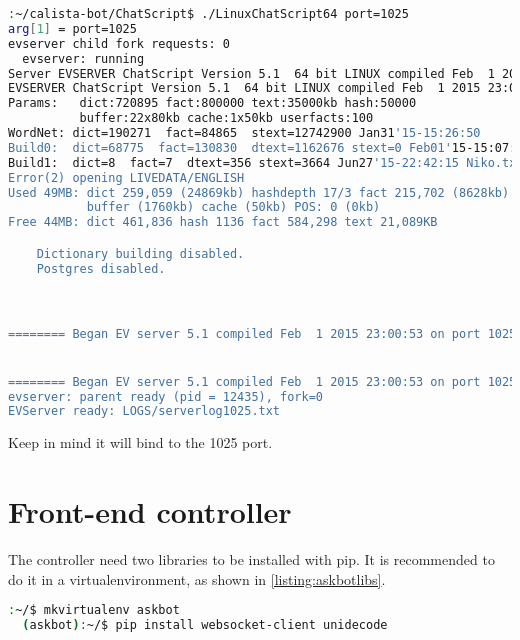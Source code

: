 \begin{center} 
  \begin{lstlisting}[language=bash, captionpos=b, caption=ChatScript Server running, label=listing:csserver]
  :~/calista-bot/ChatScript$ ./LinuxChatScript64 port=1025
arg[1] = port=1025
evserver child fork requests: 0
  evserver: running
Server EVSERVER ChatScript Version 5.1  64 bit LINUX compiled Feb  1 2015 23:00:53
EVSERVER ChatScript Version 5.1  64 bit LINUX compiled Feb  1 2015 23:00:53
Params:   dict:720895 fact:800000 text:35000kb hash:50000 
          buffer:22x80kb cache:1x50kb userfacts:100
WordNet: dict=190271  fact=84865  stext=12742900 Jan31'15-15:26:50
Build0:  dict=68775  fact=130830  dtext=1162676 stext=0 Feb01'15-15:07:58 0.txt
Build1:  dict=8  fact=7  dtext=356 stext=3664 Jun27'15-22:42:15 Niko.txt
Error(2) opening LIVEDATA/ENGLISH
Used 49MB: dict 259,059 (24869kb) hashdepth 17/3 fact 215,702 (8628kb) text 13910kb
           buffer (1760kb) cache (50kb) POS: 0 (0kb)
Free 44MB: dict 461,836 hash 1136 fact 584,298 text 21,089KB 

    Dictionary building disabled.
    Postgres disabled.



======== Began EV server 5.1 compiled Feb  1 2015 23:00:53 on port 1025 at Tue Jun 30 23:41:37 2015 serverlog:1 userlog: 0


======== Began EV server 5.1 compiled Feb  1 2015 23:00:53 on port 1025 at Tue Jun 30 23:41:37 2015 serverlog:1 userlog: 0
evserver: parent ready (pid = 12435), fork=0
EVServer ready: LOGS/serverlog1025.txt

  \end{lstlisting}
\end{center}

Keep in mind it will bind to the 1025 port.

\section{Front-end controller}

The controller need two libraries to be installed with pip. It is recommended to do it in a virtualenvironment, as shown in \ref{listing:askbotlibs}.

\begin{center} 
  \begin{lstlisting}[language=bash, captionpos=b, caption=Libraries for the front end controller, label=listing:askbotlibs]
  :~/$ mkvirtualenv askbot
  (askbot):~/$ pip install websocket-client unidecode
  \end{lstlisting}
\end{center}

